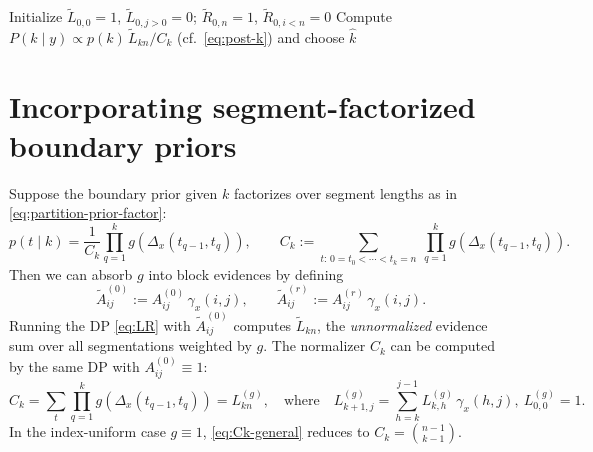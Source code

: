 \begin{algorithm}[H]
\caption{Generic algebraic DP for EF segmentation (prefix/suffix form)}
\label{alg:dp-core}
Initialize $\widetilde{L}_{0,0}=1$, $\widetilde{L}_{0,j>0}=0$; $\widetilde{R}_{0,n}=1$, $\widetilde{R}_{0,i<n}=0$\;
Compute $P(k\mid y)\propto p(k)\,\widetilde{L}_{k n}/C_k$ (cf.\ \eqref{eq:post-k}) and choose $\widehat{k}$\;
\end{algorithm}

\section{Incorporating segment-factorized boundary priors}
\label{subsec:priorinc}

Suppose the boundary prior given $k$ factorizes over segment lengths as in \eqref{eq:partition-prior-factor}:
\[
p(t\mid k) = \frac{1}{C_k}\prod_{q=1}^k g(\Delta_x(t_{q-1},t_q)),
\qquad
C_k := \sum_{t:\,0=t_0<\cdots<t_k=n}\ \prod_{q=1}^k g(\Delta_x(t_{q-1},t_q)).
\]
Then we can absorb $g$ into block evidences by defining
\begin{equation}
\widetilde{A}^{(0)}_{ij} := A^{(0)}_{ij}\,\gamma_x(i,j),
\qquad
\widetilde{A}^{(r)}_{ij} := A^{(r)}_{ij}\,\gamma_x(i,j).
\label{eq:Atilde}
\end{equation}
Running the DP \eqref{eq:LR} with $\widetilde{A}^{(0)}_{ij}$ computes $\widetilde{L}_{k n}$,
the \emph{unnormalized} evidence sum over all segmentations weighted by $g$. The normalizer
$C_k$ can be computed by the same DP with $A^{(0)}_{ij}\equiv 1$:
\begin{equation}
C_k
 = \sum_{t}\prod_{q=1}^k g(\Delta_x(t_{q-1},t_q))
 = L^{(g)}_{k n},
\quad\text{where}\quad
L^{(g)}_{k+1,j}=\sum_{h=k}^{j-1}L^{(g)}_{k,h}\,\gamma_x(h,j),\ L^{(g)}_{0,0}=1.
\label{eq:Ck-general}
\end{equation}
In the index-uniform case $g\equiv 1$, \eqref{eq:Ck-general} reduces to $C_k=\binom{n-1}{k-1}$.

